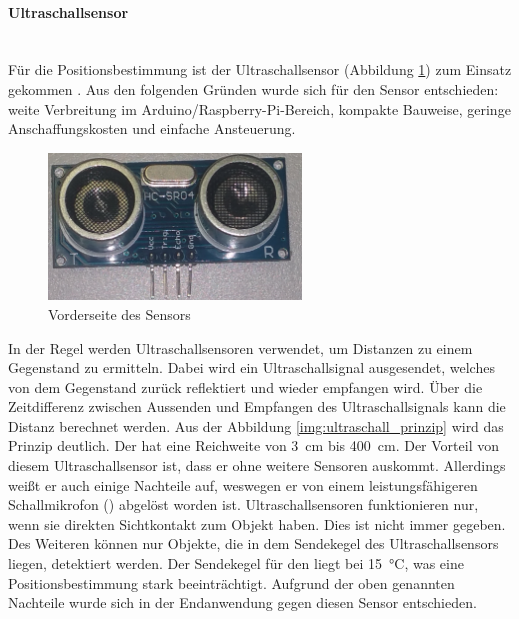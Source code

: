 \paragraph{Ultraschallsensor}\mbox{}\\
Für die Positionsbestimmung ist der Ultraschallsensor \ultraschall \platz (Abbildung \ref{img:ultraschallsensor}) zum Einsatz gekommen \cite{src_HC_SR04}. Aus den folgenden Gründen wurde sich für den \ultraschall \platz Sensor entschieden: weite Verbreitung im Arduino/Raspberry-Pi-Bereich, kompakte Bauweise, geringe Anschaffungskosten und einfache Ansteuerung.

\begin{figure}%
\centering
\includegraphics[width=0.6\textwidth]{images/ultraschallsensor.png}
\caption{Vorderseite des \ultraschall \platz Sensors}
\label{img:ultraschallsensor}
\end{figure}

In der Regel werden Ultraschallsensoren verwendet, um Distanzen zu einem Gegenstand zu ermitteln. Dabei wird ein Ultraschallsignal ausgesendet, welches von dem Gegenstand zurück reflektiert und wieder empfangen wird. Über die Zeitdifferenz zwischen Aussenden und Empfangen des Ultraschallsignals kann die Distanz berechnet werden. Aus der Abbildung \ref{img:ultraschall_prinzip} wird das Prinzip deutlich. Der \ultraschall \platz hat eine Reichweite von \SI{3}{\centi \metre} bis \SI{400}{\centi \metre}. Der Vorteil von diesem Ultraschallsensor ist, dass er ohne weitere Sensoren auskommt. Allerdings weißt er auch einige Nachteile auf, weswegen er von einem leistungsfähigeren Schallmikrofon (\microphone) abgelöst worden ist. Ultraschallsensoren funktionieren nur, wenn sie direkten Sichtkontakt zum Objekt haben. Dies ist nicht immer gegeben. Des Weiteren können nur Objekte, die in dem Sendekegel des Ultraschallsensors liegen, detektiert werden. Der Sendekegel für den \ultraschall \platz liegt bei \SI{15}{\degreeCelsius}, was eine Positionsbestimmung stark beeinträchtigt. Aufgrund der oben genannten Nachteile wurde sich in der Endanwendung gegen diesen Sensor entschieden.

